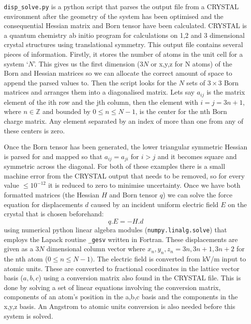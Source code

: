 \texttt{disp\_solve.py} is a python script that parses the output file from a CRYSTAL environment after the geometry of the system has been optimised and the consequential Hessian matrix and Born tensor have been calculated. CRYSTAL is a quantum chemistry ab initio program for calculations on 1,2 and 3 dimensional crystal structures using translational symmetry. This output file contains several pieces of information. Firstly, it stores the number of atoms in the unit cell for a system `$N$'. This gives us the first dimension ($3N$ or x,y,z for N atoms) of the Born and Hessian matrices so we can allocate the correct amount of space to append the parsed values to. Then the script looks for the $N$ sets of $3\times3$ Born matrices and arranges them into a diagonalised matrix. Lets say $a_{ij}$ is the matrix element of the ith row and the jth column, then the element with $i = j = 3n+1$, where $n \in \mathbb{Z}$ and bounded by $0 \leq n \leq N-1$, is the center for the nth Born charge matrix. Any element separated by an index of more than one from any of these centers is zero.

Once the Born tensor has been generated, the lower triangular symmetric Hessian is parsed for and mapped so that $a_{ij} = a_{ji}$ for $i > j$ and it becomes square and symmetric across the diagonal. For both of these examples there is a small machine error from the CRYSTAL output that needs to be removed, so for every value $\leq 10^{-12}$ it is reduced to zero to minimise uncertainty. Once we have both formatted matrices (the Hessian $H$ and Born tensor $q$) we can solve the force equation for displacements $d$ caused by an incident uniform electric field $E$ on the crystal that is chosen beforehand:
\begin{equation*}
q.E = -H.d
\end{equation*}
using numerical python linear algebra modules (\texttt{numpy.linalg.solve}) that employs the Lapack routine \texttt{\_gesv} written in Fortran. These displacements are given as a $3N$ dimensional column vector where $x_n,y_n,z_n = 3n, 3n+1, 3n+2$ for the nth atom ($0\leq n \leq N-1)$. The electric field is converted from kV/m input to atomic units. These are converted to fractional coordinates in the lattice vector basis ($a,b,c$) using a conversion matrix also found in the CRYSTAL file. This is done by solving a set of linear equations involving the conversion matrix, components of an atom's position in the a,b,c basis and the components in the x,y,z basis. An Angstrom to atomic units conversion is also needed before this system is solved.

